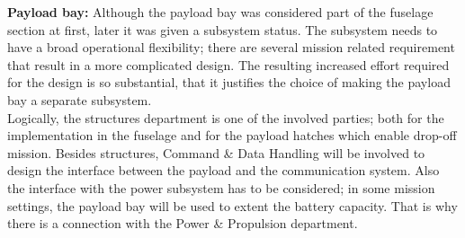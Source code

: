 \noindent \textbf{Payload bay:} Although the payload bay was considered part of the fuselage section at first, later it was given a subsystem status. The subsystem needs to have a broad operational flexibility; there are several mission related requirement that result in a more complicated design. The resulting increased effort required for the design is so substantial, that it justifies the choice of making the payload bay a separate subsystem.\\ \indent Logically, the structures department is one of the involved parties; both for the implementation in the fuselage and for the payload hatches which enable drop-off mission. Besides structures, Command \& Data Handling will be involved to design the interface between the payload and the communication system. Also the interface with the power subsystem has to be considered; in some mission settings, the payload bay will be used to extent the battery capacity. That is why there is a connection with the Power \& Propulsion department.

